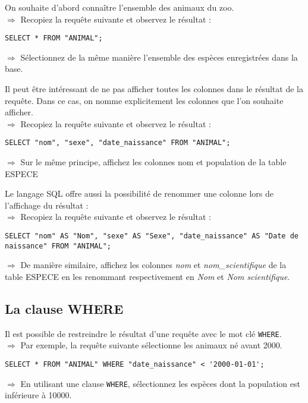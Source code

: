 \documentclass[11pt]{article}
\begin{document}
				On souhaite d'abord connaître l'ensemble des animaux du zoo.\\
				$\Rightarrow$ Recopiez la requête suivante et observez le résultat :
				\begin{lstlisting}
SELECT * FROM "ANIMAL";
				\end{lstlisting}
				
				$\Rightarrow$ Sélectionnez de la même manière l'ensemble des espèces enregistrées dans la base.
				
				Il peut être intéressant de ne pas afficher toutes les colonnes dans le résultat de la requête. Dans ce cas, on nomme explicitement les colonnes que l'on souhaite afficher.\\
				$\Rightarrow$ Recopiez la requête suivante et observez le résultat :
				\begin{lstlisting}
SELECT "nom", "sexe", "date_naissance" FROM "ANIMAL";
				\end{lstlisting}
				
				$\Rightarrow$ Sur le même principe, affichez les colonnes nom et population de la table ESPECE
			
				Le langage SQL offre aussi la possibilité de renommer une colonne lors de l'affichage du résultat :\\
				$\Rightarrow$ Recopiez la requête suivante et observez le résultat :
				\begin{lstlisting}
SELECT "nom" AS "Nom", "sexe" AS "Sexe", "date_naissance" AS "Date de naissance" FROM "ANIMAL";
				\end{lstlisting}
				 
				$\Rightarrow$ De manière similaire, affichez les colonnes \textit{nom} et \textit{nom\_scientifique} de la table ESPECE en les renommant respectivement en \textit{Nom} et \textit{Nom scientifique}.
				
				
			\subsection{La clause WHERE}
				Il est possible de restreindre le résultat d'une requête avec le mot clé \lstinline{WHERE}.\\
				$\Rightarrow$ Par exemple, la requête suivante sélectionne les animaux né avant 2000.
				\begin{lstlisting}
SELECT * FROM "ANIMAL" WHERE "date_naissance" < '2000-01-01';
				\end{lstlisting}
				
				$\Rightarrow$ En utilisant une clause \lstinline{WHERE}, sélectionnez les espèces dont la population est inférieure à 10000.
				
\end{document}
